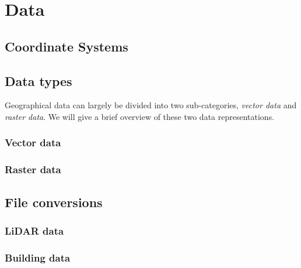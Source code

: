 \section{Data}



\subsection{Coordinate Systems}


\subsection{Data types}

Geographical data can largely be divided into two sub-categories, \textit{vector data} and \textit{raster data}.
We will give a brief overview of these two data representations.

\subsubsection{Vector data}


\subsubsection{Raster data}


\subsection{File conversions}

\subsubsection{LiDAR data}


\subsubsection{Building data}

